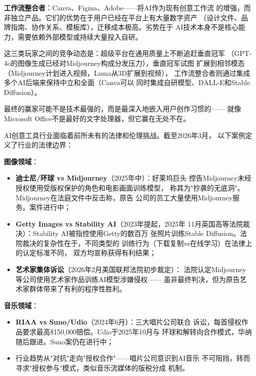 \textbf{工作流整合者}：Canva、Figma、Adobe——将AI作为现有创意工作流
的增强，而非独立产品。它们的优势在于用户已经在平台上有大量数字资产
（设计文件、品牌指南、协作关系、模板库），迁移成本极高。劣势在于
AI技术本身不是核心能力，需要依赖外部模型或持续大量投入自研。

这三类玩家之间的竞争动态是：超级平台在通用质量上不断追赶垂直冠军
（GPT-4o的图像生成已经对Midjourney构成分发压力），垂直冠军试图
扩展到相邻模态（Midjourney计划进入视频，Luma从3D扩展到视频），
工作流整合者则通过集成多个AI后端来保持中立和全面（Canva可以
同时集成自研模型、DALL-E和Stable Diffusion）。

最终的赢家可能不是技术最强的，而是最深入地嵌入用户创作习惯的——
就像Microsoft Office不是最好的文字处理器，但它赢在无处不在。

\begin{warnbox}
AI创意工具行业面临着前所未有的法律和伦理挑战。截至2026年3月，
以下案例定义了行业的法律边界：

\textbf{图像领域}：
\begin{itemize}
  \item \textbf{迪士尼/环球 vs Midjourney}（2025年中）：好莱坞巨头
    控告Midjourney未经授权使用受版权保护的角色和电影画面训练模型，
    称其为"抄袭的无底洞"。Midjourney在法庭文件中反击称，原告
    公司的员工大量使用Midjourney服务。案件进行中；
  \item \textbf{Getty Images vs Stability AI}（2023年提起，2025年
    11月英国高等法院裁决）：Stability AI被指控使用Getty的数百万
    张照片训练Stable Diffusion。法院裁决的复杂性在于，不同类型的
    训练行为（下载复制vs在线学习）在法律上的认定标准不同，
    双方均宣称获得有利结果；
  \item \textbf{艺术家集体诉讼}（2026年2月美国联邦法院初步裁定）：
    法院认定Midjourney等公司使用艺术家作品训练AI模型涉嫌侵权——
    虽非最终判决，但为原告艺术家群体带来了有利的程序性胜利。
\end{itemize}

\textbf{音乐领域}：
\begin{itemize}
  \item \textbf{RIAA vs Suno/Udio}（2024年6月）：三大唱片公司联合
    诉讼，每首侵权作品要求最高\$150,000赔偿。Udio于2025年10月与
    环球和解转向合作模式，华纳随后跟进。Suno案仍在进行中；
  \item 行业趋势从"对抗"走向"授权合作"——唱片公司意识到AI音乐
    不可阻挡，转而寻求"授权参与"模式，类似音乐流媒体的版税分成
    机制。
\end{itemize}


\end{warnbox}
